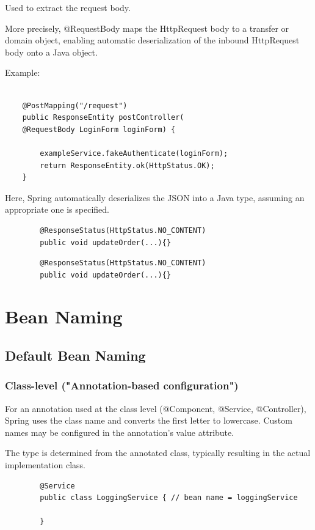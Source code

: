 \documentclass{scrartcl}
\begin{document}
    Used to extract the request body.

    More precisely, @RequestBody maps the HttpRequest body to a transfer or domain object, enabling automatic deserialization of the inbound HttpRequest body onto a Java object.

    Example:

    \begin{lstlisting}

    @PostMapping("/request")
    public ResponseEntity postController(
    @RequestBody LoginForm loginForm) {

        exampleService.fakeAuthenticate(loginForm);
        return ResponseEntity.ok(HttpStatus.OK);
    }

    \end{lstlisting}
    Here, Spring automatically deserializes the JSON into a Java type, assuming an appropriate one is specified.

    \begin{lstlisting}
        @ResponseStatus(HttpStatus.NO_CONTENT)
        public void updateOrder(...){}
    \end{lstlisting}

    \begin{lstlisting}
        @ResponseStatus(HttpStatus.NO_CONTENT)
        public void updateOrder(...){}
    \end{lstlisting}


\section{Bean Naming}
\label{sec:bean-naming}
\subsection{Default Bean Naming}
\subsubsection{Class-level ("Annotation-based configuration")}
For an annotation used at the class level (@Component, @Service, @Controller), Spring uses the class name and converts the first letter to lowercase.
Custom names may be configured in the annotation's value attribute.

The type is determined from the annotated class, typically resulting in the actual
implementation class.

    \begin{lstlisting}
        @Service
        public class LoggingService { // bean name = loggingService

        }
    \end{lstlisting}
\end{document}
